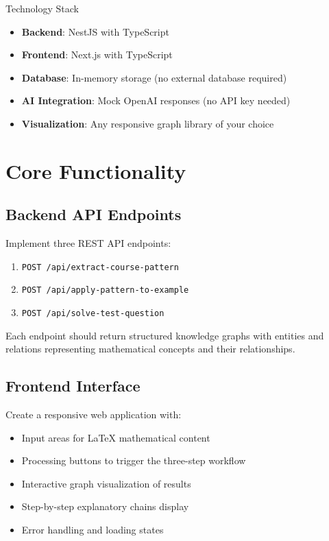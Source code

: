 \documentclass[11pt,a4paper]{article}
\begin{document}
\begin{infobox}{Technology Stack}
\begin{itemize}
    \item \textbf{Backend}: NestJS with TypeScript
    \item \textbf{Frontend}: Next.js with TypeScript
    \item \textbf{Database}: In-memory storage (no external database required)
    \item \textbf{AI Integration}: Mock OpenAI responses (no API key needed)
    \item \textbf{Visualization}: Any responsive graph library of your choice
\end{itemize}
\end{infobox}

\section{Core Functionality}

\subsection{Backend API Endpoints}

Implement three REST API endpoints:

\begin{enumerate}
    \item \texttt{POST /api/extract-course-pattern}
    \item \texttt{POST /api/apply-pattern-to-example}
    \item \texttt{POST /api/solve-test-question}
\end{enumerate}

Each endpoint should return structured knowledge graphs with entities and relations representing mathematical concepts and their relationships.

\subsection{Frontend Interface}

Create a responsive web application with:
\begin{itemize}
    \item Input areas for LaTeX mathematical content
    \item Processing buttons to trigger the three-step workflow
    \item Interactive graph visualization of results
    \item Step-by-step explanatory chains display
    \item Error handling and loading states
\end{itemize}
\end{document}
